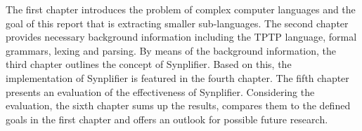 The first chapter introduces the problem of complex computer languages and the goal of this report that is extracting smaller sub-languages.
The second chapter provides necessary background information including the \ac{TPTP} language, formal grammars, lexing and parsing. By means of the background information, the third chapter outlines the concept of \ac{Synplifier}.
Based on this, the implementation of \ac{Synplifier} is featured in the fourth chapter.
The fifth chapter presents an evaluation of the effectiveness of \ac{Synplifier}. Considering the evaluation, the sixth chapter sums up the results, compares them to the defined goals in the first chapter and offers an outlook for possible future research.